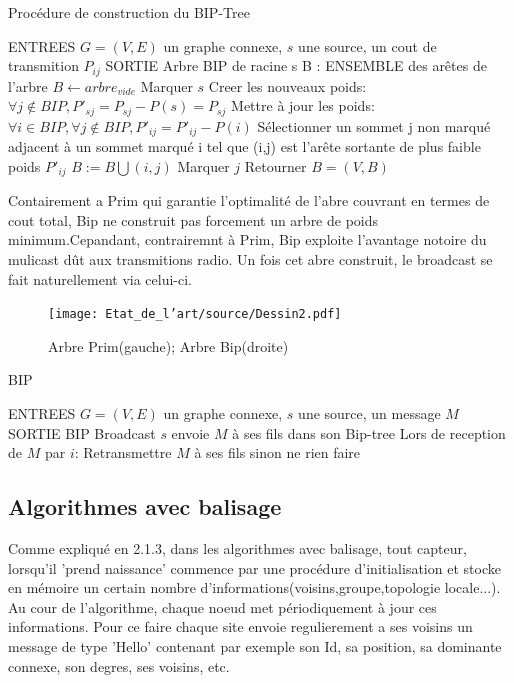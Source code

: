 \begin{algorithm}[h]
\caption{Procédure de construction du BIP-Tree}
\label{algo_BIP_tree}
\begin{algorithmic}
\STATE ENTREES  $G=(V,E)$ un graphe connexe, $s$ une source, un cout de transmition $P_{ij}$
\STATE SORTIE  Arbre BIP de racine s
\STATE B : ENSEMBLE des arêtes de l'arbre
\STATE  $B \leftarrow arbre_{vide}$
\STATE Marquer $s$
\STATE Creer les nouveaux poids: $\forall j \notin BIP, P'_{sj}=P_{sj}-P(s)=P_{sj}$
   \STATE Mettre à jour les poids:  $ \forall i \in BIP, \forall j \notin BIP, P'_{ij}=P'_{ij}-P(i)$
   \STATE Sélectionner un sommet j non marqué adjacent à un sommet marqué i tel que (i,j) est l'arête sortante de plus faible poids $P'_{ij}$
   \STATE $B := B\bigcup   {(i,j)}$
   \STATE Marquer $j$
\ENDWHILE
\STATE Retourner $B=(V,B)$
\end{algorithmic}
\end{algorithm}

Contairement a Prim qui garantie l'optimalité de l'abre couvrant en termes de cout total,
Bip ne construit pas forcement un arbre de poids minimum.Cepandant, contrairemnt à Prim, Bip exploite l'avantage notoire du mulicast dût aux transmitions radio. Un fois cet abre construit, le broadcast se fait naturellement via celui-ci.

\begin{figure}[H]
\centering
\texttt{[image: Etat\_de\_l'art/source/Dessin2.pdf]}
\caption{ Arbre Prim(gauche); Arbre Bip(droite)}
\end{figure} 

\begin{algorithm}[h]
\caption{BIP}
\label{algo_BIP}
\begin{algorithmic}
\STATE ENTREES  $G=(V,E)$ un graphe connexe, $s$ une source, un message $M$
\STATE SORTIE  BIP Broadcast
\STATE $s$ envoie $M$ à ses fils dans son Bip-tree
\STATE Lors de reception de $M$ par $i$:
    \STATE Retransmettre $M$ à ses fils sinon ne rien faire
\ENDIF
\end{algorithmic}
\end{algorithm}




\subsection{Algorithmes avec balisage}
Comme expliqué en 2.1.3, dans les algorithmes avec balisage, tout capteur, lorsqu'il 'prend naissance' commence par une procédure d'initialisation et stocke en 
mémoire un certain nombre d'informations(voisins,groupe,topologie locale...). Au cour de l'algorithme, chaque noeud met périodiquement à jour ces informations. Pour ce faire chaque site envoie regulierement a ses voisins un message de type
'Hello' contenant par exemple son Id, sa position, sa dominante connexe, son degres, ses voisins, etc.\\
